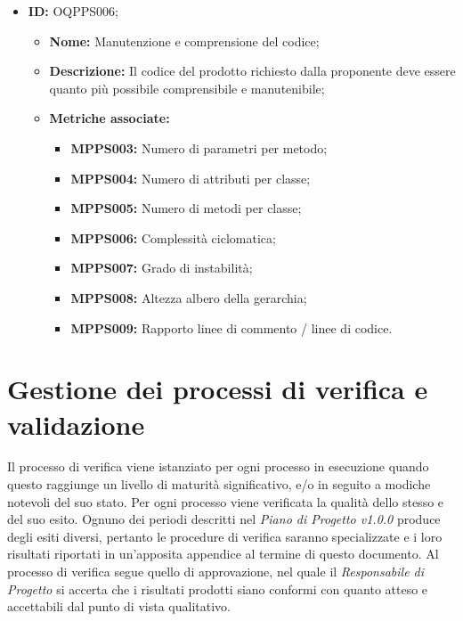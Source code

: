 \documentclass[openany,12pt,a4paper]{report}
\begin{document}
        \begin{itemize}
            \item \textbf{ID:} OQPPS006;
            \begin{itemize} 
            	\item \textbf{Nome:} Manutenzione e comprensione del codice;
            	\item \textbf{Descrizione:} Il codice del prodotto richiesto dalla proponente deve essere quanto più possibile comprensibile e manutenibile;
            	\item \textbf{Metriche associate:} 
                \begin{itemize}
                    \item \textbf{MPPS003:} Numero di parametri per metodo;
                    \item \textbf{MPPS004:} Numero di attributi per classe;
                    \item \textbf{MPPS005:} Numero di metodi per classe;
                    \item \textbf{MPPS006:} Complessità ciclomatica;
                    \item \textbf{MPPS007:} Grado di instabilità;
                    \item \textbf{MPPS008:} Altezza albero della gerarchia;
                    \item \textbf{MPPS009:} Rapporto linee di commento / linee di codice.
                \end{itemize}
            \end{itemize}
        \end{itemize}

    \section{Gestione dei processi di verifica e validazione}
        
    Il processo di verifica viene istanziato per ogni processo in esecuzione quando questo raggiunge un livello di maturità significativo, e/o in seguito a modiche notevoli del suo stato. Per ogni processo viene verificata la qualità dello stesso e del suo esito. 
    Ognuno dei periodi descritti nel \textit{Piano di Progetto v1.0.0} produce degli esiti diversi, pertanto le procedure di verifica saranno specializzate e i loro risultati riportati in un'apposita appendice al termine di questo documento. 
    Al processo di verifica segue quello di approvazione, nel quale il \textit{Responsabile di Progetto} si accerta che i risultati prodotti siano conformi con quanto atteso e accettabili dal punto di vista qualitativo.
\end{document}
